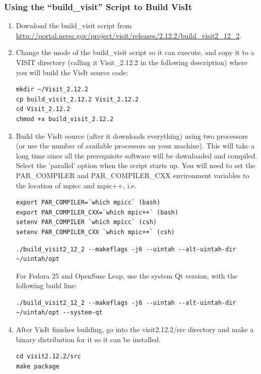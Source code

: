 \documentclass[12pt]{article}
\begin{document}
\subsubsection{Using the ``build\_visit'' Script to Build VisIt}
\label{subsec:VisItVersion2_tarball}


\begin{enumerate}
\item Download the build\_visit script from
  \url{http://portal.nersc.gov/project/visit/releases/2.12.2/build_visit2_12_2}.

\item Change the mode of the build\_visit script so it can execute, and
  copy it to a VISIT directory (calling it Visit\_2.12.2 in the
  following description) where you will build the VisIt source code:
\begin{verbatim}
mkdir ~/Visit_2.12.2
cp build_visit_2.12.2 Visit_2.12.2
cd Visit_2.12.2
chmod +x build_visit_2.12.2
\end{verbatim}

\item Build the VisIt source (after it downloads everything) using two
  processors (or use the number of available processors on your
  machine). This will take a long time since all the prerequisite
  software will be downloaded and compiled. Select the 'parallel'
  option when the script starts up.  You will need to set the
  PAR\_COMPILER and PAR\_COMPILER\_CXX environment variables to the
  location of mpicc and mpic++, i.e.

\begin{verbatim}
export PAR_COMPILER=`which mpicc` (bash)
export PAR_COMPILER_CXX=`which mpic++` (bash)
setenv PAR_COMPILER `which mpicc` (csh)
setenv PAR_COMPILER_CXX `which mpic++` (csh)
\end{verbatim}

\begin{verbatim}
./build_visit2_12_2 --makeflags -j6 --uintah --alt-uintah-dir ~/uintah/opt
\end{verbatim}

For Fedora 25 and OpenSuse Leap, use the system Qt version, with the following build
line:

\begin{verbatim}
./build_visit2_12_2 --makeflags -j6 --uintah --alt-uintah-dir
~/uintah/opt --system-qt
\end{verbatim}



\item After VisIt finishes building, go into the visit2.12.2/src
  directory and make a binary distribution for it so it can be
  installed.  
\begin{verbatim}
cd visit2.12.2/src
make package 
\end{verbatim}


\end{enumerate}
\end{document}
